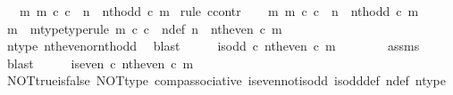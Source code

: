 \begin{isabellebody}
\ \ \ {\isachardoublequoteopen}{\isasymexists}m{\isachardot}{\kern0pt}\ m\ {\isasymin}\isactrlsub c\ {\isasymnat}\isactrlsub c\ {\isasymand}\ n\ {\isacharequal}{\kern0pt}\ nth{\isacharunderscore}{\kern0pt}odd\ {\isasymcirc}\isactrlsub c\ m{\isachardoublequoteclose}\isanewline
%
\isadelimproof
%
\endisadelimproof
%
\isatagproof
{}\isamarkupfalse%
\ {\isacharparenleft}{\kern0pt}rule\ ccontr{\isacharparenright}{\kern0pt}\isanewline
\ \ \isamarkupfalse%
\ {\isachardoublequoteopen}{\isasymnexists}m{\isachardot}{\kern0pt}\ m\ {\isasymin}\isactrlsub c\ {\isasymnat}\isactrlsub c\ {\isasymand}\ n\ {\isacharequal}{\kern0pt}\ nth{\isacharunderscore}{\kern0pt}odd\ {\isasymcirc}\isactrlsub c\ m{\isachardoublequoteclose}\isanewline
\ \ \isamarkupfalse%
\ \isamarkupfalse%
\ m\ \ m{\isacharunderscore}{\kern0pt}type{\isacharbrackleft}{\kern0pt}type{\isacharunderscore}{\kern0pt}rule{\isacharbrackright}{\kern0pt}{\isacharcolon}{\kern0pt}\ {\isachardoublequoteopen}m\ {\isasymin}\isactrlsub c\ {\isasymnat}\isactrlsub c{\isachardoublequoteclose}\ \ n{\isacharunderscore}{\kern0pt}def{\isacharcolon}{\kern0pt}\ {\isachardoublequoteopen}n\ {\isacharequal}{\kern0pt}\ nth{\isacharunderscore}{\kern0pt}even\ {\isasymcirc}\isactrlsub c\ m{\isachardoublequoteclose}\isanewline
\ \ \ \ \isamarkupfalse%
\ n{\isacharunderscore}{\kern0pt}type\ nth{\isacharunderscore}{\kern0pt}even{\isacharunderscore}{\kern0pt}or{\isacharunderscore}{\kern0pt}nth{\isacharunderscore}{\kern0pt}odd\ \isamarkupfalse%
\ blast\isanewline
\ \ \isamarkupfalse%
\ \isamarkupfalse%
\ {\isachardoublequoteopen}is{\isacharunderscore}{\kern0pt}odd\ {\isasymcirc}\isactrlsub c\ nth{\isacharunderscore}{\kern0pt}even\ {\isasymcirc}\isactrlsub c\ m\ {\isacharequal}{\kern0pt}\ {\isasymt}{\isachardoublequoteclose}\isanewline
\ \ \ \ \isamarkupfalse%
\ assms{\isacharparenleft}{\kern0pt}{}{\isacharparenright}{\kern0pt}\ \isamarkupfalse%
\ blast\isanewline
\ \ \isamarkupfalse%
\ \isamarkupfalse%
\ {\isachardoublequoteopen}is{\isacharunderscore}{\kern0pt}even\ {\isasymcirc}\isactrlsub c\ nth{\isacharunderscore}{\kern0pt}even\ {\isasymcirc}\isactrlsub c\ m\ {\isacharequal}{\kern0pt}\ {\isasymf}{\isachardoublequoteclose}\isanewline
\ \ \ \ \isamarkupfalse%
\ NOT{\isacharunderscore}{\kern0pt}true{\isacharunderscore}{\kern0pt}is{\isacharunderscore}{\kern0pt}false\ NOT{\isacharunderscore}{\kern0pt}type\ comp{\isacharunderscore}{\kern0pt}associative{}\ is{\isacharunderscore}{\kern0pt}even{\isacharunderscore}{\kern0pt}not{\isacharunderscore}{\kern0pt}is{\isacharunderscore}{\kern0pt}odd\ is{\isacharunderscore}{\kern0pt}odd{\isacharunderscore}{\kern0pt}def{}\ n{\isacharunderscore}{\kern0pt}def\ n{\isacharunderscore}{\kern0pt}type\ \isamarkupfalse%

\end{isabellebody}
